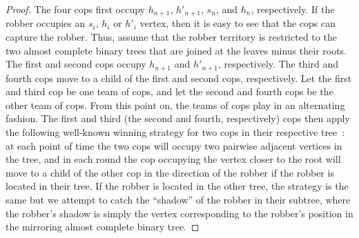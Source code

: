\documentclass[letterpaper]{article} %
\begin{document}
\begin{proof}
The four cops first occupy $h_{n+1}$, $h'_{n+1}$, $s_n$, and $h_n$, respectively.
If the robber occupies an $s_i$, $h_i$ or $h'_i$ vertex, then it is easy to see that the cops can capture the robber.
Thus, assume that the robber territory is restricted to the two almost complete binary trees that are joined at the leaves minus their roots.
The first and second cops occupy $h_{n+1}$ and $h'_{n+1}$, respectively. The third and fourth cops move to a child of the first and second cops, respectively.
Let the first and third cop be one team of cops, and let the second and fourth cops be the other team of cops.
From this point on, the teams of cops play in an alternating fashion.
The first and third (the second and fourth, respectively) cops then apply the following well-known winning strategy for two cops in their respective tree~\cite{SeymourT93}: at each point of time the two cops will occupy two pairwise adjacent vertices in the tree, and in each round the cop occupying the vertex closer to the root will move to a child of the other cop in the direction of the robber if the robber is located in their tree. If the robber is located in the other tree, the strategy is the same but we attempt to catch the ``shadow'' of the robber in their subtree, where the robber's shadow is simply the vertex corresponding to the robber's position in the mirroring almost complete binary tree.
\end{proof}
\end{document}
